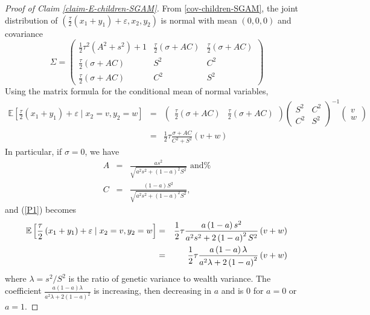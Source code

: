 \documentclass[
  12pt,
]{article}
\theoremstyle{definition}
\theoremstyle{definition}
\theoremstyle{definition}
\theoremstyle{definition}
\theoremstyle{remark}
\begin{document}
\begin{proof}[Proof of Claim \ref{claim-E-children-SGAM}]

From \eqref{cov-children-SGAM}, the joint distribution of $\left( \frac{\tau }{2}\left(
x_{1}+y_{1}\right) +\varepsilon ,x_{2},y_{2}\right) $ is normal with mean $%
\left( 0,0,0\right) $ and covariance$\allowbreak $%
\[
\Sigma =\left( 
\begin{array}{rrr}
\frac{1}{2}\tau ^{2}\left( A^{2}+s^{2}\right) +1 & \frac{\tau }{2}\left(
\sigma +AC\right)  & \frac{\tau }{2}\left( \sigma +AC\right)  \\ 
\frac{\tau }{2}\left( \sigma +AC\right)  & S^{2} & C^{2} \\ 
\frac{\tau }{2}\left( \sigma +AC\right)  & C^{2} & S^{2}%
\end{array}%
\right) 
\]%
Using the matrix formula for the conditional mean of normal variables,
\begin{eqnarray}
\mathbb{E}\left[ \frac{\tau }{2}\left( x_{1}+y_{1}\right) +\varepsilon \mid
x_{2}=v,y_{2}=w\right]  &=&\left( 
\begin{array}{rr}
\frac{\tau }{2}\left( \sigma +AC\right)  & \frac{\tau }{2}\left( \sigma
+AC\right) 
\end{array}%
\right) \left( 
\begin{array}{rr}
S^{2} & C^{2} \\ 
C^{2} & S^{2}%
\end{array}%
\right) ^{-1}\left( 
\begin{array}{r}
v \\ 
w%
\end{array}%
\right)   \nonumber \\
&=&\frac{1}{2}\tau \frac{\sigma +AC}{C^{2}+S^{2}}\left( v+w\right) 
\label{P1}
\end{eqnarray}%
In particular, if $\sigma =0$, we have%
\begin{eqnarray*}
A &=&\frac{as^{2}}{\sqrt{a^{2}s^{2}+\left( 1-a\right) ^{2}S^{2}}}\textrm{ \ and%
} \\
C &=&\frac{\left( 1-a\right) S^{2}}{\sqrt{a^{2}s^{2}+\left( 1-a\right)
^{2}S^{2}}},
\end{eqnarray*}%
and (\ref{P1}) becomes 
\begin{eqnarray*}
\mathbb{E}\left[ \frac{\tau }{2}\left( x_{1}+y_{1}\right) +\varepsilon \mid
x_{2}=v,y_{2}=w\right]  &=&\frac{1}{2}\tau \frac{a\left( 1-a\right) s^{2}}{%
a^{2}s^{2}+2\left( 1-a\right) ^{2}S^{2}}\left( v+w\right)  \\
&=&\frac{1}{2}\tau \frac{a\left( 1-a\right) \lambda }{a^{2}\lambda +2\left(
1-a\right) ^{2}}\left( v+w\right) 
\end{eqnarray*}
where $\lambda =s^{2}/S^{2}$ is the ratio of genetic variance to wealth variance.
The coefficient $\frac{a\left( 1-a\right) \lambda }{a^{2}\lambda +2\left(
1-a\right) ^{2}}$ is increasing, then decreasing in $a$ and is 0 for $a =  0$ or $a = 1$.
\end{proof}
\end{document}
